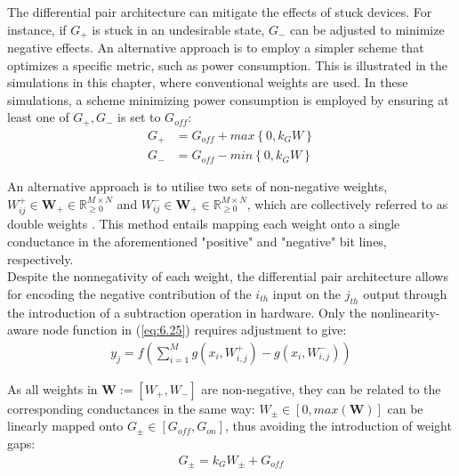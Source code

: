 \noindent The differential pair architecture can mitigate the effects of stuck devices. For instance, if $G_+$ is stuck in an undesirable state, $G_-$ can be adjusted to minimize negative effects. An alternative approach is to employ a simpler scheme that optimizes a specific metric, such as power consumption. This is illustrated in the simulations in this chapter, where conventional weights are used. In these simulations, a scheme minimizing power consumption is employed by ensuring at least one of ${G_+, G_-}$ is set to $G_{off}$:
\begin{align}
G_+ &= G_{off} + max\left\{ 0, k_GW \right\} \label{eq:6.31} \\
G_- &= G_{off} - min\left\{ 0, k_GW \right\} \label{eq:6.32}
\end{align}

\noindent An alternative approach is to utilise two sets of non-negative weights, $W^+_{ij} \in \mathbf{W}_+ \in \mathbb{R}^{M \times N}_{\ge 0}$ and $W^-_{ij} \in \mathbf{W}_+ \in \mathbb{R}^{M \times N}_{\ge 0}$, which are collectively referred to as double weights \cite{kendall2020training}. This method entails mapping each weight onto a single conductance in the aforementioned "positive" and "negative" bit lines, respectively. \\

\noindent Despite the nonnegativity of each weight, the differential pair architecture allows for encoding the negative contribution of the $i_{th}$ input on the $j_{th}$ output through the introduction of a subtraction operation in hardware. Only the nonlinearity-aware node function in (\ref{eq:6.25}) requires adjustment to give:
\begin{align}
y_j = f\left( \sum_{i=1}^{M} g\left( x_i,W_{i,j}^+ \right) - g\left( x_i,W_{i,j}^- \right) \right) \label{eq:6.33}
\end{align}

\noindent As all weights in $\mathbf{W} := [W_+, W_-]$ are non-negative, they can be related to the corresponding conductances in the same way: $W_{\pm} \in [0, max(\mathbf{W})]$ can be linearly mapped onto $G_{\pm} \in [G_{off}, G_{on}]$, thus avoiding the introduction of weight gaps:
\begin{align}
G_{\pm} = k_GW_{\pm} + G_{off} \label{eq:6.34}
\end{align}

